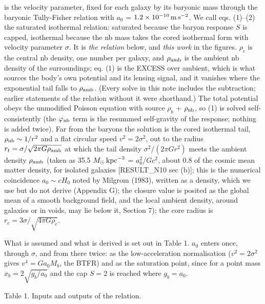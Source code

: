 \documentclass[
  10pt,
]{article}
\begin{document}
is the velocity parameter, fixed for each galaxy by its baryonic mass
through the baryonic Tully-Fisher relation with $a_0$ = $1.2\times10^{-10}\,{\rm m\,s^{-2}}$. We call eqs. (1)--(2) the saturated isothermal relation: saturated because the baryon response $S$ is capped, isothermal because the nb mass takes the cored isothermal form with velocity parameter $\sigma$. It is \emph{the relation} below, and \emph{this work} in the figures.
$\rho_c$ is the central nb density, one number per galaxy, and $\rho_{\rm amb}$ is
the ambient nb density of the surroundings; eq. (1) is the EXCESS over
ambient, which is what sources the body's own potential and its lensing
signal, and it vanishes where the exponential tail falls to $\rho_{\rm amb}$.
(Every solve in this note includes the subtraction; earlier statements
of the relation without it were shorthand.) The total potential obeys the
unmodified Poisson equation with source $\rho_b$ + $\rho_{\rm nb}$, so (1) is
solved self-consistently (the $\varphi_{\rm nb}$ term is the resummed self-gravity
of the response; nothing is added twice). Far from the baryons the
solution is the cored isothermal tail, $\rho_{\rm nb}\sim 1/r^2$ and a flat circular speed $v^2=2\sigma^2$, out to the
radius $r_t=\sigma/\sqrt{2\pi G\rho_{\rm amb}}$ at which the tail density
$\sigma^2/(2\pi G r^2)$ meets the ambient density $\rho_{\rm amb}$ (taken as
35.5 $M_\odot\,{\rm kpc}^{-3}$ = $a_0^2/Gc^2$, about 0.8 of the cosmic mean
matter density, for isolated galaxies {[}RESULT\_N10 sec (b){]}; this is the numerical coincidence $a_0\sim cH_0$ noted by Milgrom (1983), written as a density, which we use but do not derive (Appendix G); the closure value is posited as the global mean of a smooth background field,
and the local ambient density, around galaxies or in voids, may lie below
it, Section 7); the
core radius is $r_c=3\sigma/\sqrt{4\pi G\rho_c}$.

What is assumed and what is derived is set out in Table 1. $a_0$ enters
once, through $\sigma$, and from there twice: as the low-acceleration
normalisation ($v^2=2\sigma^2$ gives $v^4=G a_0 M_b$, the BTFR)
and as the saturation point, since for a point mass $x_b=2\sqrt{g_b/a_0}$ and the cap $S=2$ is reached where $g_b=a_0$.

Table 1. Inputs and outputs of the relation.
\end{document}
